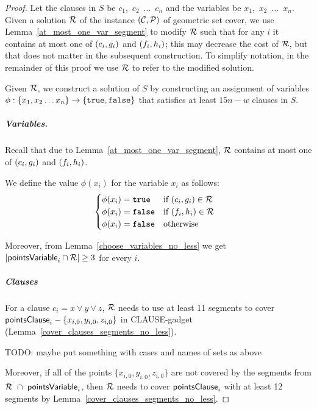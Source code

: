 \begin{proof}\leavevmode
Let the clauses in $S$ be $c_1$,~$c_2$~$\ldots$~$c_n$
and the variables be $x_1$,~$x_2$~$\ldots$~$x_n$.
Given a solution $\mathcal{R}$
of the instance $(\mathcal{C}, \mathcal{P})$ of geometric set cover, we use Lemma~\ref{at_most_one_var_segment} to modify $\mathcal{R}$ such that for any $i$ it contains at most one of $(c_{i}, g_{i})$ and $(f_{i}, h_{i})$; this may decrease the cost of $\mathcal{R}$, but that does not matter in the subsequent construction. To simplify notation, in the remainder of this proof we use $\mathcal{R}$ to refer to the modified solution.

Given $\mathcal{R}$, we construct a solution of $S$ by constructing an
assignment of variables 
$\phi : \{ x_1, x_2 \ldots x_n\} \rightarrow \{\texttt{true}, \texttt{false}\}$
that satisfies at least $15n-w$ clauses in $S$.

\subparagraph{Variables.}
Recall that due to Lemma~\ref{at_most_one_var_segment}, $\mathcal{R}$ contains at most one of $(c_{i}, g_{i})$ and $(f_{i}, h_{i})$.

We define the value $\phi(x_i)$ for the variable $x_i$ as follows:
\begin{align}
	\begin{split}
	\label{eqn:variable_assignment}
	& \begin{cases}
	\phi(x_i) = \texttt{true} & \text{if}\ (c_{i}, g_{i}) \in \mathcal{R} \\
	\phi(x_i) = \texttt{false} & \text{if}\ (f_{i}, h_{i}) \in \mathcal{R} \\
	\phi(x_i) = \texttt{false} & \text{otherwise}
	\end{cases}
	\end{split}
\end{align}

Moreover, from Lemma~\ref{choose_variables_no_less} we get $|\mathsf{pointsVariable}_{i} \cap \mathcal{R}| \ge 3$ for every $i$.

\subparagraph{Clauses}

For a clause $c_i = x \lor y \lor z$,
$\mathcal{R}$ needs to use at least 11 segments to cover $\mathsf{pointsClause}_i - \{x_{i,0}, y_{i,0}, z_{i,0}\}$
in CLAUSE-gadget (Lemma~\ref{cover_clauses_segments_no_less}).

TODO: maybe put something with cases and names of sets as above

Moreover, if all of the points $\{x_{i,0}, y_{i,0}, z_{i,0}\}$
are not covered by the segments from $\mathcal{R}~\cap~\mathsf{pointsVariable}_{i}$,
then $\mathcal{R}$ needs to cover $\mathsf{pointsClause}_i$
with at least 12 segments
by Lemma~\ref{cover_clauses_segments_no_less}.



\end{proof}
